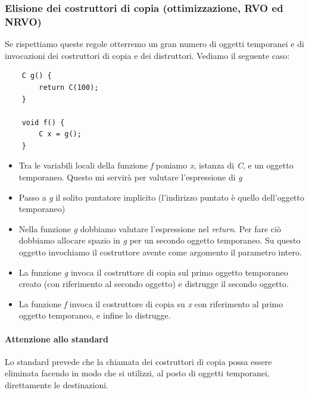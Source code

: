 \subsubsection{Elisione dei costruttori di copia (ottimizzazione, RVO ed NRVO)} 
Se rispettiamo queste regole otterremo un gran numero di oggetti temporanei e di invocazioni dei costruttori di copia e dei distruttori. Vediamo il seguente caso:
\begin{verbatim}
	C g() {
		return C(100);
	}
	
	void f() {
		C x = g();
	}
\end{verbatim}
\begin{itemize}
	\item Tra le variabili locali della funzione \emph{f} poniamo \emph{x}, istanza di \emph{C}, e un oggetto temporaneo. Questo mi servirà per valutare l'espressione di \emph{g}
	\item Passo a \emph{g} il solito puntatore implicito (l'indirizzo puntato è quello dell'oggetto temporaneo)
	\item Nella funzione \emph{g} dobbiamo valutare l'espressione nel \emph{return}. Per fare ciò dobbiamo allocare spazio in \emph{g} per un secondo oggetto temporaneo. Su questo oggetto invochiamo il costruttore avente come argomento il parametro intero.
	\item La funzione \emph{g} invoca il costruttore di copia sul primo oggetto temporaneo creato (con riferimento al secondo oggetto) e distrugge il secondo oggetto.
	\item La funzione \emph{f} invoca il costruttore di copia su \emph{x} con riferimento al primo oggetto temporaneo, e infine lo distrugge.
\end{itemize}
\paragraph{Attenzione allo standard} Lo standard prevede che la chiamata dei costruttori di copia possa essere eliminata facendo in modo che si utilizzi, al posto di oggetti temporanei, direttamente le destinazioni. 
